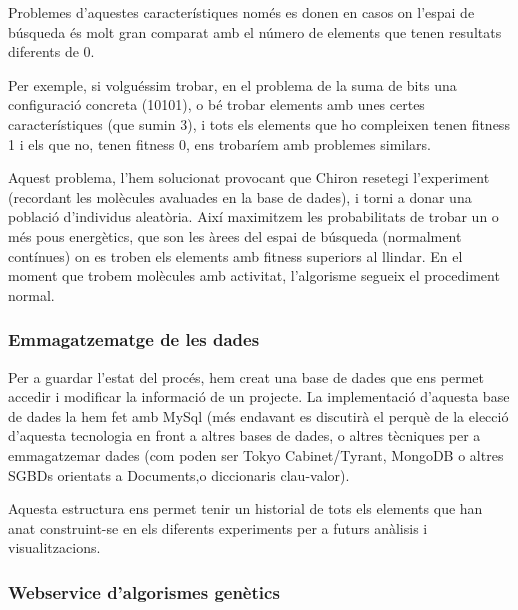 Problemes d'aquestes característiques només es donen en casos on l'espai de
búsqueda és molt gran comparat amb el número de elements que tenen resultats
diferents de 0.

Per exemple, si volguéssim trobar, en el problema de la suma de bits una
configuració concreta (10101), o bé trobar elements amb unes certes
característiques (que sumin 3), i tots els elements que ho compleixen tenen
fitness 1 i els que no, tenen fitness 0, ens trobaríem amb problemes similars.

Aquest problema, l'hem solucionat provocant que Chiron resetegi l'experiment
(recordant les molècules avaluades en la base de dades), i torni a donar una
població d'individus aleatòria.  Així maximitzem les probabilitats de trobar un
o més pous energètics, que son les àrees del espai de búsqueda (normalment
contínues) on es troben els elements amb fitness superiors al llindar.  En el
moment que trobem molècules amb activitat, l'algorisme segueix el procediment
normal.

\subsubsection{Emmagatzematge de les dades} %
\label{ssub:Emmagatzematge de les dades}

Per a guardar l'estat del procés, hem creat una base de dades que ens permet
accedir i modificar la informació de un projecte.  La implementació d'aquesta
base de dades la hem fet amb MySql (més endavant es discutirà el perquè de la
elecció d'aquesta tecnologia en front a altres bases de dades, o altres
tècniques per a emmagatzemar dades (com poden ser Tokyo Cabinet/Tyrant, MongoDB
o altres SGBDs orientats a Documents,o diccionaris clau-valor).

\lstset{language=sql, tabsize=2}
\lstset{commentstyle=\textit}


Aquesta estructura ens permet tenir un historial de tots els elements que han
anat construint-se en els diferents experiments per a futurs anàlisis i
visualitzacions.

\subsubsection{Webservice d'algorismes genètics} %
\label{ssub:Webservice d'algorismes genetics}

